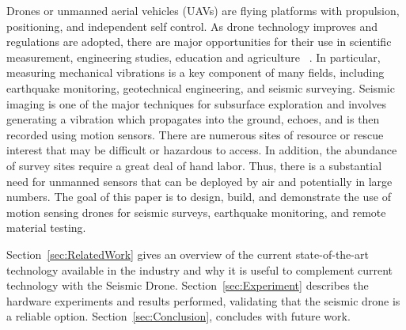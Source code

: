 Drones or unmanned aerial vehicles (UAVs) are flying
platforms with propulsion, positioning, and independent self control.
As drone technology improves and regulations are
adopted, there are major opportunities for their use in scientific measurement, engineering studies, education and agriculture ~\cite{tripicchio2015towards}. In particular,
measuring mechanical vibrations is a key component of many
fields, including earthquake monitoring, geotechnical engineering,
and seismic surveying. Seismic imaging is one of the
major techniques for subsurface exploration
and involves generating a vibration which propagates
into the ground, echoes, and is then recorded using motion
sensors. There are numerous sites of resource or rescue interest
that may be difficult or hazardous to access. In addition, the abundance of survey sites require a great deal
of hand labor. Thus, there is a substantial need for unmanned
sensors that can be deployed by air and potentially in large
numbers. 
The goal of this paper is to design, build, and demonstrate
the use of motion sensing drones for seismic surveys, earthquake monitoring, and remote material testing. 

Section~\ref{sec:RelatedWork}  gives an overview of  the current state-of-the-art technology available in the industry and why it is useful to complement current technology  with the Seismic Drone.
Section~\ref{sec:Experiment} describes the hardware experiments and results performed, validating that the seismic drone is a reliable option. Section~\ref{sec:Conclusion}, concludes with future work.

